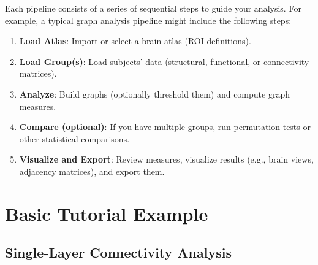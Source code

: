 \documentclass[justified]{tufte-handout}
\begin{document}
Each pipeline consists of a series of sequential steps to guide your analysis. For example, a typical graph analysis pipeline might include the following steps:
\begin{enumerate}
    \item \textbf{Load Atlas}: Import or select a brain atlas (ROI definitions).
    \item \textbf{Load Group(s)}: Load subjects' data (structural, functional, or connectivity matrices).
    \item \textbf{Analyze}: Build graphs (optionally threshold them) and compute graph measures.
    \item \textbf{Compare (optional)}: If you have multiple groups, run permutation tests or other statistical comparisons.
    \item \textbf{Visualize and Export}: Review measures, visualize results (e.g., brain views, adjacency matrices), and export them.
\end{enumerate}

\section{Basic Tutorial Example}

\subsection{Single-Layer Connectivity Analysis}
\end{document}
